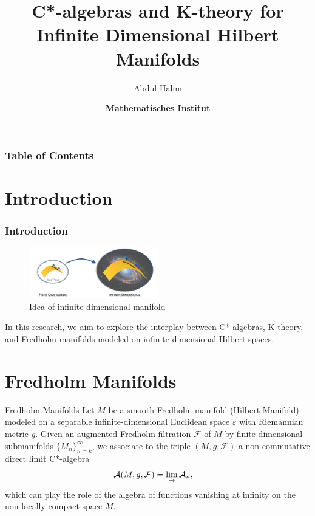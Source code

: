 \documentclass{beamer}
\title[C*-algebras and K-theory] %
{C*-algebras and K-theory for Infinite Dimensional Hilbert Manifolds}\label{titlepage}
\author[Abdul Halim] 
{Abdul Halim\inst{1}}
\institute[] 
{
  \inst{1}
 \texttt{abdul.halim@uni-goettingen.de}
}
\date[] 
{\large \textbf{Mathematisches Institut}}
\begin{document}
\frame{\titlepage}


\begin{frame}
\frametitle{Table of Contents}
\tableofcontents
\end{frame}


\section{Introduction}

\begin{frame}
\frametitle{Introduction}
\begin{center}
\begin{figure}[h!]
\includegraphics[width=0.5\textwidth]{manifold.png}
\caption{Idea of infinite dimensional manifold}
\end{figure}
\end{center}
In this research, we aim to explore the interplay between C*-algebras, K-theory, and Fredholm manifolds modeled on infinite-dimensional Hilbert spaces. 
\end{frame}

\section{Fredholm Manifolds}
\begin{frame}{Fredholm Manifolds}
    Let \(M\) be a smooth Fredholm manifold (Hilbert Manifold) modeled on a separable infinite-dimensional Euclidean space \(\varepsilon\) with Riemannian metric \(g\). Given an augmented Fredholm filtration \(\mathcal{F}\) of \(M\) by finite-dimensional submanifolds \(\{M_{n}\}_{n=k}^{\infty}\), we associate to the triple \((M,g, \mathcal{F})\) a non-commutative direct limit C*-algebra
        \begin{align}{\label{Mgf}}
            \mathcal{A}(M,g,\mathcal{F}) &= \lim_{\substack{\to}} \mathcal{A}_{n},
        \end{align}
        which can play the role of the algebra of functions vanishing at infinity on the non-locally compact space \(M\).
\end{frame}
\end{document}
